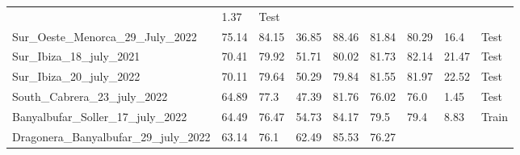 \begin{table}[H]
{\begin{tabular}{lllllllll}
                                                   & 1.37                &
            {\color[HTML]{fc8d62} Test}
            \\
            Sur\_Oeste\_Menorca\_29\_July\_2022    & 75.14               &
            84.15
                                                   & 36.85               &
            88.46
                                                   & 81.84               &
            80.29
                                                   & 16.4                &
            {\color[HTML]{fc8d62} Test}
            \\
            Sur\_Ibiza\_18\_july\_2021             & 70.41               &
            79.92
                                                   & 51.71               &
            80.02
                                                   & 81.73               &
            82.14
                                                   & 21.47               &
            {\color[HTML]{fc8d62} Test}
            \\
            Sur\_Ibiza\_20\_july\_2022             & 70.11               &
            79.64
                                                   & 50.29               &
            79.84
                                                   & 81.55               &
            81.97
                                                   & 22.52               &
            {\color[HTML]{fc8d62} Test}
            \\
            South\_Cabrera\_23\_july\_2022         & 64.89               & 77.3
                                                   & 47.39               &
            81.76
                                                   & 76.02               & 76.0
                                                   & 1.45                &
            {\color[HTML]{fc8d62} Test}
            \\
            Banyalbufar\_Soller\_17\_july\_2022    & 64.49               &
            76.47
                                                   & 54.73               &
            84.17
                                                   & 79.5                & 79.4
                                                   & 8.83                &
            {\color[HTML]{66c2a5} Train}
            \\
            Dragonera\_Banyalbufar\_29\_july\_2022 & 63.14               & 76.1
                                                   & 62.49               &
            85.53
                                                   & 76.27               &

\end{tabular}}
\end{table}
